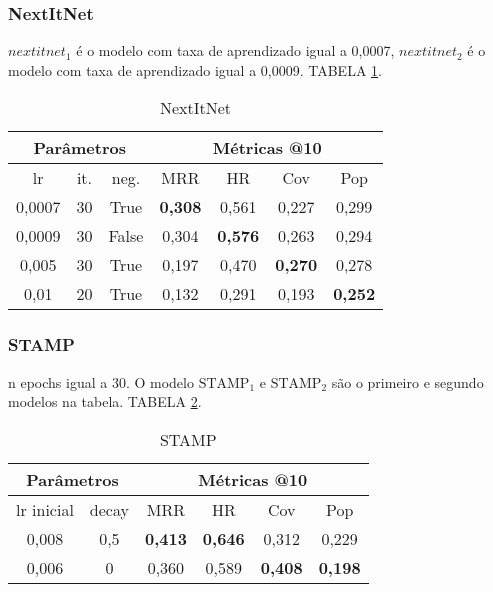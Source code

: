 \subsubsection{NextItNet}
$nextitnet_1$ é o modelo com taxa de aprendizado igual a 0,0007, $nextitnet_2$ é
o modelo com taxa de aprendizado igual a 0,0009. TABELA \ref{app:nextitnet}.
\begin{table}[htbp]
  \centering
  \begin{tabular}{|c|c|c|c|c|c|c|}
    \hline
      \multicolumn{3}{|c|}{Parâmetros} & \multicolumn{4}{c|}{Métricas @10} \\
      \hline
      lr & it. & neg. & MRR & HR & Cov & Pop \\
      \hline
      0,0007 & 30 & True & \textbf{0,308} & 0,561 & 0,227 & 0,299 \\
      \hline
      0,0009 & 30 & False & 0,304 & \textbf{0,576} & 0,263 & 0,294 \\
      \hline
      0,005 & 30 & True & 0,197 & 0,470 & \textbf{0,270} & 0,278 \\
      \hline
      0,01 & 20 & True & 0,132 & 0,291 & 0,193 & \textbf{0,252} \\
      \hline
    \end{tabular}
    \caption{NextItNet} \label{app:nextitnet}
\end{table}

\subsubsection{STAMP}


n epochs igual a 30. O modelo $\text{STAMP}_{1}$ e $\text{STAMP}_{2}$
são o primeiro e segundo modelos na tabela. TABELA \ref{app:stamp}.

\begin{table}[htbp]
  \centering
  \begin{tabular}{|c|c|c|c|c|c|}
    \hline
      \multicolumn{2}{|c|}{Parâmetros} & \multicolumn{4}{c|}{Métricas @10} \\
      \hline
      lr inicial & decay & MRR & HR & Cov & Pop \\
      \hline
      0,008 & 0,5 & \textbf{0,413} & \textbf{0,646} & 0,312 & 0,229 \\
      \hline
      0,006 & 0 & 0,360 & 0,589 & \textbf{0,408} & \textbf{0,198} \\
      \hline
    \end{tabular}
    \caption{STAMP} \label{app:stamp}
\end{table}


